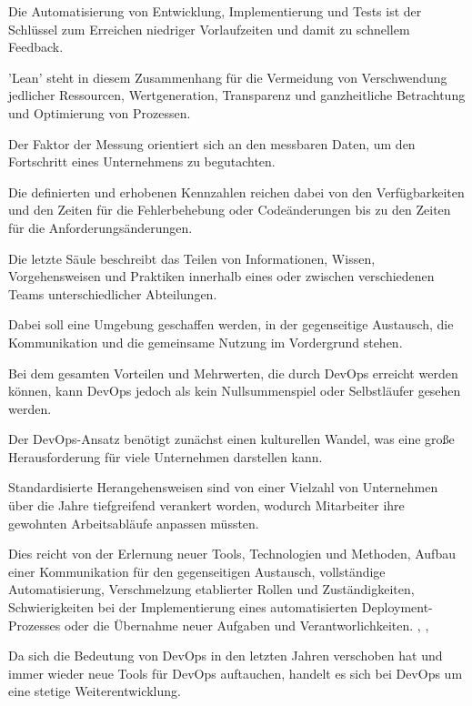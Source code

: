 Die Automatisierung von Entwicklung, Implementierung und Tests ist der Schlüssel zum Erreichen niedriger Vorlaufzeiten und damit zu schnellem Feedback. \cite{humble_why_2011}

'Lean' steht in diesem Zusammenhang für die Vermeidung von Verschwendung jedlicher Ressourcen, Wertgeneration, Transparenz und ganzheitliche Betrachtung und Optimierung von Prozessen.

Der Faktor der Messung orientiert sich an den messbaren Daten, um den Fortschritt eines Unternehmens zu begutachten. 

Die definierten und erhobenen Kennzahlen reichen dabei von den Verfügbarkeiten und den Zeiten für die Fehlerbehebung oder Codeänderungen bis zu den Zeiten für die Anforderungsänderungen. \cite[S. 7]{halstenberg_devops_2020}  

Die letzte Säule beschreibt das Teilen von Informationen, Wissen, Vorgehensweisen und Praktiken innerhalb eines oder zwischen verschiedenen Teams unterschiedlicher Abteilungen. \cite{halstenberg_devops_2020} 

Dabei soll eine Umgebung geschaffen werden, in der gegenseitige Austausch, die Kommunikation und die gemeinsame Nutzung im Vordergrund stehen.

Bei dem gesamten Vorteilen und Mehrwerten, die durch DevOps erreicht werden können, kann DevOps jedoch als kein Nullsummenspiel oder Selbstläufer gesehen werden. \cite{humble_why_2011} 

Der DevOps-Ansatz benötigt zunächst einen kulturellen Wandel, was eine große Herausforderung für viele Unternehmen darstellen kann. 

Standardisierte Herangehensweisen sind von einer Vielzahl von Unternehmen über die Jahre tiefgreifend verankert worden, wodurch Mitarbeiter ihre gewohnten Arbeitsabläufe anpassen müssten. 
 
Dies reicht von der Erlernung neuer Tools, Technologien und Methoden, Aufbau einer Kommunikation für den gegenseitigen Austausch, vollständige Automatisierung, Verschmelzung etablierter Rollen und Zuständigkeiten, Schwierigkeiten bei der Implementierung eines automatisierten Deployment-Prozesses oder die Übernahme neuer Aufgaben und Verantworlichkeiten. \cite{lwakatare_devops_2019}, \cite[S. 594 - 595]{abrahamsson_product-focused_2016}, \cite[S. 43 - 45]{halstenberg_devops_2020}

Da sich die Bedeutung von DevOps in den letzten Jahren verschoben hat und immer wieder neue Tools für DevOps auftauchen, handelt es sich bei DevOps um eine stetige Weiterentwicklung. \cite[S. 595]{abrahamsson_product-focused_2016} 

